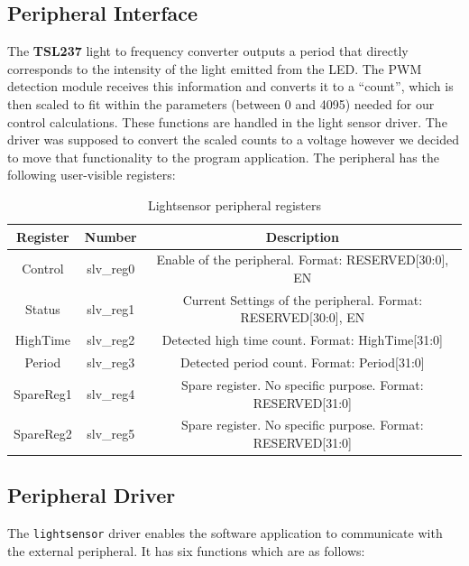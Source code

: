 \documentclass[11pt]{article}
\begin{document}
\subsection{Peripheral Interface}
The \textbf{TSL237} light to frequency converter outputs a period that directly corresponds to the intensity of the light emitted from the LED.  The PWM detection module receives this information and converts it to a ``count'', which is then scaled to fit within the parameters (between 0 and 4095) needed for our control calculations.  These functions are handled in the light sensor driver.  The driver was supposed to convert the scaled counts to a voltage however we decided to move that functionality to the program application.
The peripheral has the following user-visible registers:
	\begin {table}[h!]
	\begin {center} 
	\vspace{15pt}
	
	\begin{tabular}{||c|c|c||}\hline
		\textbf{Register}	&	\textbf{Number}	&	\textbf{Description}		\\\hline
		Control				&	slv\_reg0		&	Enable of the peripheral. Format: {RESERVED[30:0], EN}		\\\hline
		Status				&	slv\_reg1		&	Current Settings of the peripheral. Format: {RESERVED[30:0], EN}		\\\hline
		HighTime			&	slv\_reg2		&	Detected high time count. Format: HighTime[31:0]			\\\hline
		Period				&	slv\_reg3		&	Detected period count. Format: Period[31:0]			\\\hline
		SpareReg1			&	slv\_reg4		&	Spare register. No specific purpose. Format: RESERVED[31:0]			\\\hline
		SpareReg2			&	slv\_reg5		&	Spare register. No specific purpose. Format: RESERVED[31:0]			\\\hline
	\end{tabular}
		\caption {Lightsensor peripheral registers} \label{registers}
	\end{center}
	\end{table} 
	
\subsection{Peripheral Driver}
The \texttt{lightsensor} driver enables the software application to communicate with the external peripheral. It has six functions which are as follows:
\end{document}
